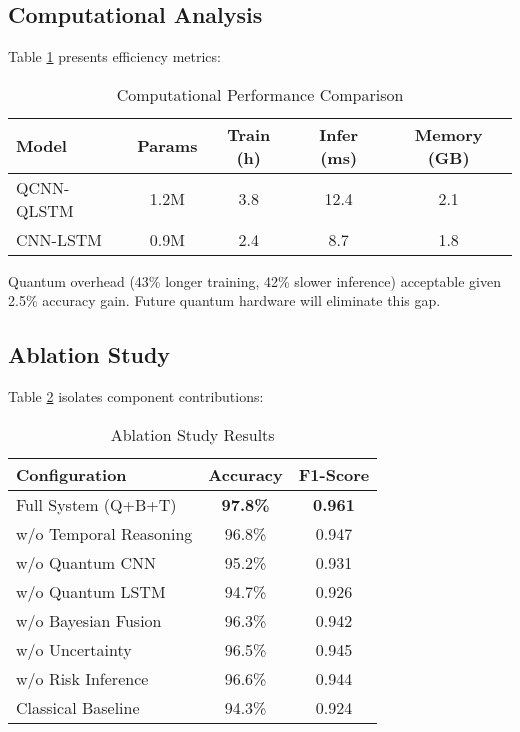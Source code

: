 \documentclass[conference]{IEEEtran}
\begin{document}
\subsection{Computational Analysis}

Table \ref{tab:computational} presents efficiency metrics:

\begin{table}[htbp]
\caption{Computational Performance Comparison}
\begin{center}
\begin{tabular}{lcccc}
\toprule
\textbf{Model} & \textbf{Params} & \textbf{Train (h)} & \textbf{Infer (ms)} & \textbf{Memory (GB)} \\
\midrule
QCNN-QLSTM & 1.2M & 3.8 & 12.4 & 2.1 \\
CNN-LSTM & 0.9M & 2.4 & 8.7 & 1.8 \\
\bottomrule
\end{tabular}
\label{tab:computational}
\end{center}
\end{table}

Quantum overhead (43\% longer training, 42\% slower inference) acceptable given 2.5\% accuracy gain. Future quantum hardware will eliminate this gap.

\subsection{Ablation Study}

Table \ref{tab:ablation} isolates component contributions:

\begin{table}[htbp]
\caption{Ablation Study Results}
\begin{center}
\begin{tabular}{lcc}
\toprule
\textbf{Configuration} & \textbf{Accuracy} & \textbf{F1-Score} \\
\midrule
Full System (Q+B+T) & \textbf{97.8\%} & \textbf{0.961} \\
w/o Temporal Reasoning & 96.8\% & 0.947 \\
w/o Quantum CNN & 95.2\% & 0.931 \\
w/o Quantum LSTM & 94.7\% & 0.926 \\
w/o Bayesian Fusion & 96.3\% & 0.942 \\
w/o Uncertainty & 96.5\% & 0.945 \\
w/o Risk Inference & 96.6\% & 0.944 \\
Classical Baseline & 94.3\% & 0.924 \\
\bottomrule
\end{tabular}
\label{tab:ablation}
\end{center}
\end{table}
\end{document}
